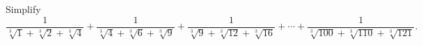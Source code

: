 Simplify
\[
\dfrac{1}{\sqrt[3]{1}+\sqrt[3]{2}+\sqrt[3]{4}}+\dfrac{1}{\sqrt[3]{4}+\sqrt[3]{6}+\sqrt[3]{9}}+\dfrac{1}{\sqrt[3]{9}+\sqrt[3]{12}+\sqrt[3]{16}}+\cdots+\dfrac{1}{\sqrt[3]{100}+\sqrt[3]{110}+\sqrt[3]{121}}.
\]
